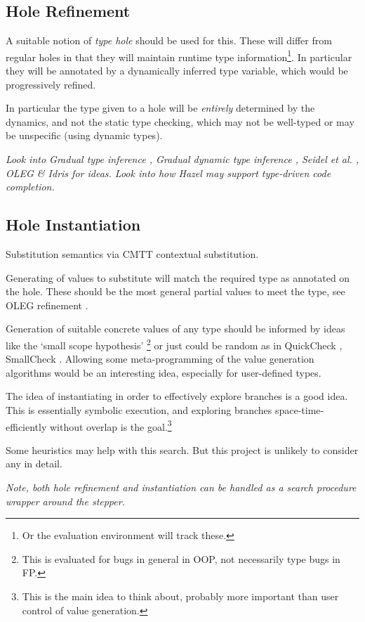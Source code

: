 \subsection{Hole Refinement}
A suitable notion of \textit{type hole} should be used for this. These will differ from regular holes in that they will maintain runtime type information\footnote{Or the evaluation environment will track these.}. In particular they will be annotated by a dynamically inferred type variable, which would be progressively refined.\par
In particular the type given to a hole will be \textit{entirely} determined by the dynamics, and not the static type checking, which may not be well-typed or may be unspecific (using dynamic types).
\par
\textit{Look into Gradual type inference \cite{GradualTI}, Gradual dynamic type inference \cite{DTI}, Seidel et al. \cite{SearchProc}, OLEG \cite[chapter~2]{OLEG} \& Idris for ideas.  
Look into how Hazel may support type-driven code completion.}
\subsection{Hole Instantiation}
Substitution semantics via CMTT contextual substitution.\par 
Generating of values to substitute will match the required type as annotated on the hole. These should be the most general partial values to meet the type, see OLEG refinement \cite[chapter~2]{OLEG}.\par
Generation of suitable concrete values of any type should be informed by ideas like the `small scope hypothesis' \cite{SmallScope}\footnote{This is evaluated for bugs in general in OOP, not necessarily type bugs in FP.} or just could be random as in QuickCheck \cite{QuickCheck}, SmallCheck \cite{SmallCheck}. Allowing some meta-programming of the value generation algorithms would be an interesting idea, especially for user-defined types.\par
The idea of instantiating in order to effectively explore branches is a good idea. This is essentially symbolic execution, and exploring branches space-time-efficiently without overlap is the goal.\footnote{This is the main idea to think about, probably more important than user control of value generation.} \par 
Some heuristics may help with this search. But this project is unlikely to consider any in detail.\par
\textit{Note, both hole refinement and instantiation can be handled as a search procedure wrapper around the stepper.}

